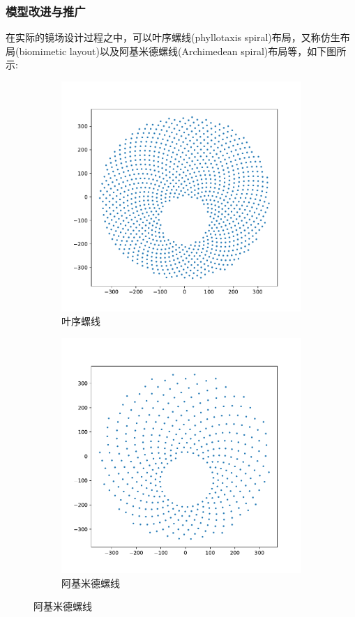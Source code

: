 \subsubsection{模型改进与推广}
在实际的镜场设计过程之中，可以叶序螺线(phyllotaxis spiral)布局，又称仿生布局(biomimetic layout)以及阿基米德螺线(Archimedean spiral)布局等\cite{noone}，如下图所示:
\begin{figure}[H]
\centering
\begin{subfigure}[b]{0.4\textwidth}
\centering
\includegraphics[scale=0.4]{yexu.pdf}
\caption{\kaishu 叶序螺线}
\end{subfigure}
%
\begin{subfigure}[b]{0.4\textwidth}
\centering
\includegraphics[scale=0.388]{ajmd.pdf}
\caption{\kaishu 阿基米德螺线}
\end{subfigure}
\end{figure}

